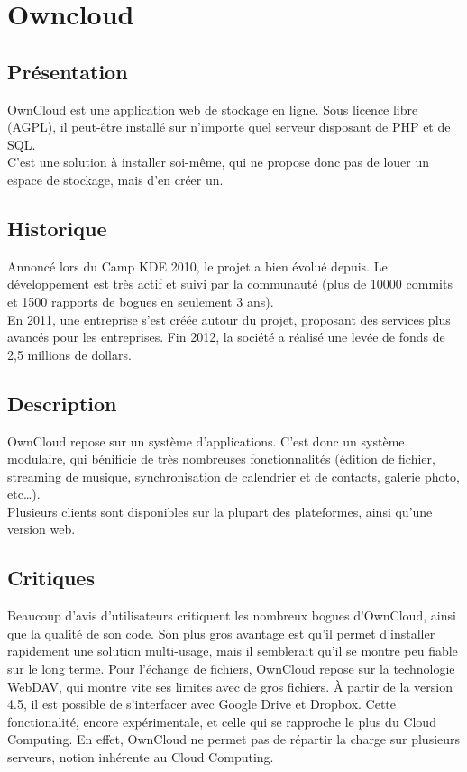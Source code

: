 \section{Owncloud}
\thispagestyle{EIP} %
\subsection{Présentation}
OwnCloud est une application web de stockage en ligne. Sous licence libre (AGPL), il peut-être installé sur n'importe quel serveur disposant de PHP et de SQL.\\
C'est une solution à installer soi-même, qui ne propose donc pas de louer un espace de stockage, mais d'en créer un.\\

\subsection{Historique}
Annoncé lors du Camp KDE 2010, le projet a bien évolué depuis. Le développement est très actif et suivi par la communauté (plus de 10000 commits et 1500 rapports de bogues en seulement 3 ans).\\

En 2011, une entreprise s'est créée autour du projet, proposant des services plus avancés pour les entreprises. Fin 2012, la société a réalisé une levée de fonds de 2,5 millions de dollars.

\subsection{Description}
OwnCloud repose sur un système d'applications. C'est donc un système modulaire, qui bénificie de très nombreuses fonctionnalités (édition de fichier, streaming de musique, synchronisation de calendrier et de contacts, galerie photo, etc…).\\
Plusieurs clients sont disponibles sur la plupart des plateformes, ainsi qu'une version web.\\

\subsection{Critiques}
Beaucoup d'avis d'utilisateurs critiquent les nombreux bogues d'OwnCloud, ainsi que la qualité de son code. Son plus gros avantage est qu'il permet d'installer rapidement une solution multi-usage, mais il semblerait qu'il se montre peu fiable sur le long terme.
Pour l'échange de fichiers, OwnCloud repose sur la technologie WebDAV, qui montre vite ses limites avec de gros fichiers.
À partir de la version 4.5, il est possible de s'interfacer avec Google Drive et Dropbox. Cette fonctionalité, encore expérimentale, et celle qui se rapproche le plus du Cloud Computing. En effet, OwnCloud ne permet pas de répartir la charge sur plusieurs serveurs, notion inhérente au Cloud Computing.
